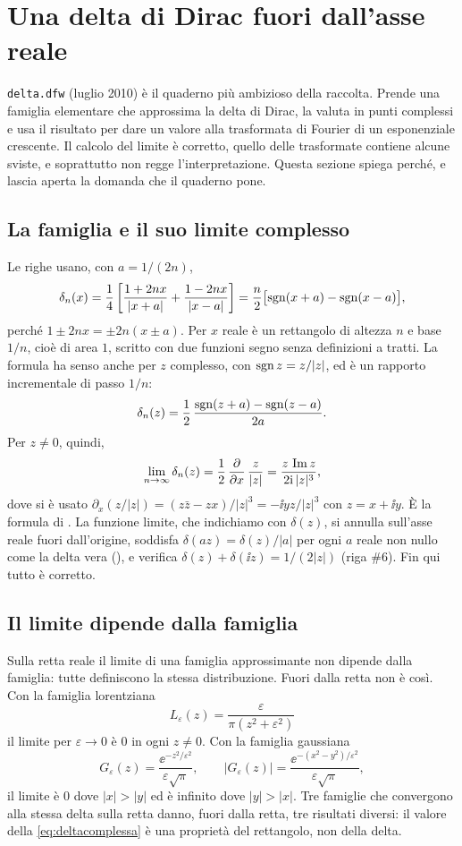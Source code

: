 \section{Una delta di Dirac fuori dall'asse reale}
\label{sec:delta}

\texttt{delta.dfw} (luglio 2010) \`e il quaderno pi\`u ambizioso della
raccolta. Prende una famiglia elementare che approssima la delta di Dirac, la
valuta in punti complessi e usa il risultato per dare un valore alla
trasformata di Fourier di un esponenziale crescente. Il calcolo del limite \`e
corretto, quello delle trasformate contiene alcune sviste, e soprattutto non
regge l'interpretazione. Questa sezione spiega perch\'e, e
lascia aperta la domanda che il quaderno pone.

\subsection{La famiglia e il suo limite complesso}

Le righe  usano, con $a=1/(2n)$,
\[
  \delta_n(x)=\frac14\left[\frac{1+2nx}{|x+a|}+\frac{1-2nx}{|x-a|}\right]
  =\frac n2\bigl[\operatorname{sgn}(x+a)-\operatorname{sgn}(x-a)\bigr],
\]
perch\'e $1\pm2nx=\pm2n(x\pm a)$. Per $x$ reale \`e un rettangolo di altezza
$n$ e base $1/n$, cio\`e di area $1$, scritto con due funzioni segno senza
definizioni a tratti. La formula ha senso anche per $z$ complesso, con
$\operatorname{sgn} z=z/|z|$, ed \`e un rapporto incrementale di passo $1/n$:
\[
  \delta_n(z)=\frac12\,\frac{\operatorname{sgn}(z+a)-\operatorname{sgn}(z-a)}{2a}.
\]
Per $z\neq0$, quindi,
\begin{equation}\label{eq:deltacomplessa}
  \lim_{n\to\infty}\delta_n(z)=\frac12\,\frac{\partial}{\partial x}\,\frac{z}{|z|}
  =\frac{z\,\operatorname{Im} z}{2\mathrm{i}\,|z|^3},
\end{equation}
dove si \`e usato $\partial_x(z/|z|)=(z\bar z-zx)/|z|^3=-\ii yz/|z|^3$ con
$z=x+\ii y$. \`E la formula di . La funzione limite, che
indichiamo con $\delta(z)$, si annulla sull'asse reale fuori dall'origine,
soddisfa $\delta(az)=\delta(z)/|a|$ per ogni $a$ reale non nullo come la
delta vera (), e verifica
$\delta(z)+\delta(\ii z)=1/(2|z|)$ (riga \#6). Fin qui tutto \`e corretto.

\subsection{Il limite dipende dalla famiglia}

Sulla retta reale il limite di una famiglia approssimante non dipende dalla
famiglia: tutte definiscono la stessa distribuzione. Fuori dalla retta non
\`e cos\`i. Con la famiglia lorentziana
\[
  L_\varepsilon(z)=\frac{\varepsilon}{\pi(z^2+\varepsilon^2)}
\]
il limite per $\varepsilon\to0$ \`e $0$ in ogni $z\neq0$. Con la famiglia
gaussiana
\[
  G_\varepsilon(z)=\frac{\ee^{-z^2/\varepsilon^2}}{\varepsilon\sqrt\pi},
  \qquad |G_\varepsilon(z)|=\frac{\ee^{-(x^2-y^2)/\varepsilon^2}}{\varepsilon\sqrt\pi},
\]
il limite \`e $0$ dove $|x|>|y|$ ed \`e infinito dove $|y|>|x|$. Tre famiglie
che convergono alla stessa delta sulla retta danno, fuori dalla retta, tre
risultati diversi: il valore della \eqref{eq:deltacomplessa} \`e una
propriet\`a del rettangolo, non della delta.

